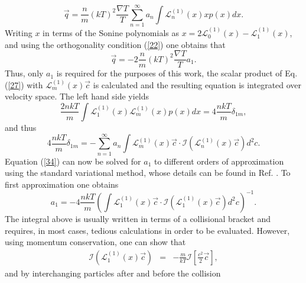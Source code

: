 \documentclass[11pt]{article} %
\begin{document}
\begin{equation}
\vec{q}=\frac{n}{m}\left(kT\right)^{2}\frac{\nabla T}{T}\sum_{n=1}^{\infty}a_{n}\int\mathcal{L}_{n}^{\left(1\right)}\left(x\right)xp\left(x\right)dx.\label{30}
\end{equation}
Writing $x$ in terms of the Sonine polynomials as $x=2\mathcal{L}_{0}^{\left(1\right)}\left(x\right)-\mathcal{L}_{1}^{\left(1\right)}\left(x\right)$, and using the orthogonality condition (\ref{22}) one obtains that
\begin{equation}
\vec{q}=-2\frac{n}{m}\left(kT\right)^{2}\frac{\nabla T}{T}a_{1}.\label{32}
\end{equation}
Thus, only $a_{1}$ is required for the purposes of this work, the
scalar product of Eq. (\ref{27}) with $\mathcal{L}_{m}^{\left(1\right)}\left(x\right)\vec{c}$ is calculated and the resulting equation is integrated over velocity
space. The left hand side yields 
\begin{equation}
\frac{2nkT}{m}\int\mathcal{L}_{1}^{\left(1\right)}\left(x\right)\mathcal{L}_{m}^{\left(1\right)}\left(x\right)p\left(x\right)dx=4\frac{nkT}{m}\delta_{1m},\label{33}
\end{equation}
and thus 
\begin{equation}
4\frac{nkT}{m}\delta_{1m}=-\sum_{n=1}^{\infty}a_{n}\int\mathcal{L}_{m}^{\left(1\right)}\left(x\right)\vec{c}\cdot\mathcal{I}\left(\mathcal{L}_{n}^{\left(1\right)}\left(x\right)\vec{c}\right)d^{2}c.\label{34}
\end{equation}
Equation (\ref{34}) can now be solved for $a_{1}$ to different orders
of approximation using the standard variational method, whose details
can be found in Ref. \cite{Hirshfelder}. To first approximation one
obtains 
\begin{equation}
a_{1}=-4\frac{nkT}{m}\left(\int\mathcal{L}_{1}^{\left(1\right)}\left(x\right)\vec{c}\cdot\mathcal{I}\left(\mathcal{L}_{1}^{\left(1\right)}\left(x\right)\vec{c}\right)d^{2}c\right)^{-1}.\label{35}
\end{equation}
The integral above is usually written in terms of a collisional bracket
and requires, in most cases, tedious calculations in order to be evaluated.
However, using momentum conservation, one can show that
\begin{eqnarray}
\mathcal{I}\left(\mathcal{L}_{1}^{\left(1\right)}\left(x\right)\vec{c}\right) 
 & = & -\frac{m}{kT}\mathcal{I}\left[\frac{c^{2}}{2}\vec{c}\right],\label{36}
\end{eqnarray}
and by interchanging particles after and before the collision
\end{document}
